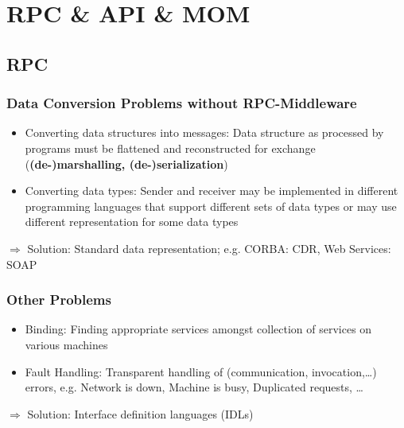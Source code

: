 \chapter{RPC \& API \& MOM}
	\section{RPC}
		\subsection{Data Conversion Problems without RPC-Middleware}
			\begin{itemize}
				\item Converting data structures into messages: Data structure as processed by programs must be flattened and reconstructed for exchange (\textbf{(de-)marshalling, (de-)serialization})
				
				\item Converting data types: Sender and receiver may be implemented in different programming
				languages that support different sets of data types or may use different representation for some data types
			\end{itemize}
			$ \Rightarrow $ Solution: Standard data representation; e.g. CORBA: CDR, Web Services: SOAP
			
		\subsection{Other Problems}
			\begin{itemize}
				\item Binding: Finding appropriate services amongst collection of services on
				various machines
				
				\item Fault Handling: Transparent handling of (communication, invocation,\ldots) errors, e.g. Network is down, Machine is busy, Duplicated requests, \ldots
			\end{itemize}
			$ \Rightarrow $ Solution: Interface definition languages (IDLs)
			
